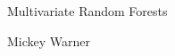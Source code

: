 \begin{center}
\begin{LARGE}
Multivariate Random Forests
\end{LARGE}

\bigskip
\bigskip

\begin{Large}
Mickey Warner
\end{Large}

\end{center}
